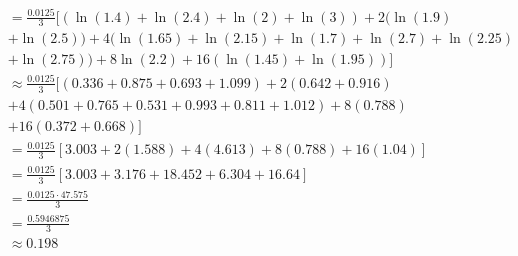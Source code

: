 \begin{answer}
\begin{align}
        &= \tfrac{0.0125}{3}[(\ln(1.4) + \ln(2.4) + \ln(2) + \ln(3)) + 2(\ln (1.9)\\
        &+ \ln (2.5)) + 4(\ln (1.65) + \ln(2.15) + \ln(1.7) + \ln(2.7) + \ln (2.25)\\
        &+ \ln(2.75)) + 8 \ln (2.2) + 16 (\ln(1.45) + \ln (1.95))]\\
        &\approx \tfrac{0.0125}{3}[(0.336 + 0.875 + 0.693 + 1.099) + 2(0.642 + 0.916)\\
        &+ 4(0.501 + 0.765 + 0.531 + 0.993 + 0.811 + 1.012) + 8(0.788)\\
        &+ 16 (0.372 + 0.668)]\\
        &= \tfrac{0.0125}{3}[3.003 + 2(1.588) + 4(4.613) + 8(0.788) + 16 (1.04)]\\
        &= \tfrac{0.0125}{3}[3.003 + 3.176 + 18.452 + 6.304 + 16.64]\\
        &= \tfrac{0.0125\cdot47.575}{3}\\
        &= \tfrac{0.5946875}{3}\\
        &\approx 0.198
    \end{align}
\end{answer}